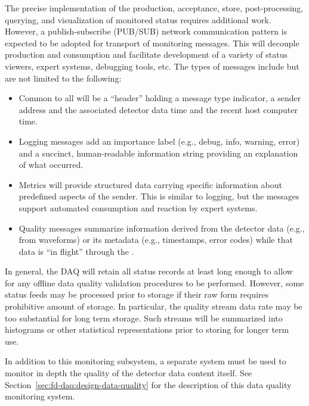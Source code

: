 The precise implementation of the production, acceptance, store, post-processing, querying, and visualization of monitored status requires additional work. 
However, a publish-subscribe (PUB/SUB) network communication pattern is expected to be adopted for transport of monitoring messages. 
This will decouple production and consumption and facilitate development of a variety of status viewers, expert systems, debugging tools, etc. 
The types of messages include but are not limited to the following:

\begin{itemize}
\item Common to all will be a ``header'' holding a message type indicator, a sender address and the associated detector data time and the recent host computer time.
 
\item Logging messages add an importance label (e.g., debug, info, warning, error) and a succinct, human-readable information string providing an explanation of what occurred.
  
\item Metrics will provide structured data carrying specific information about predefined aspects of the sender. 
  This is similar to logging, but the messages support automated consumption and reaction by expert systems.  

\item Quality messages summarize information derived from the detector data (e.g., from waveforms) or its metadata (e.g., timestamps, error codes) while that data is ``in flight'' through the .

\end{itemize}

In general, the DAQ will retain all status records at least long enough to allow for any offline data quality validation procedures to be performed. 
However, some status feeds may be processed prior to storage if their raw form requires prohibitive amount of storage. 
In particular, the quality stream data rate may be too substantial for long term storage. 
Such streams will be summarized into histograms or other statistical representations prior to storing for longer term use.

In addition to this   monitoring subsystem, a separate system must be used to monitor in depth the quality of the detector data content itself. 
See Section~\ref{sec:fd-daq:design-data-quality} for the description of this data quality monitoring system.

